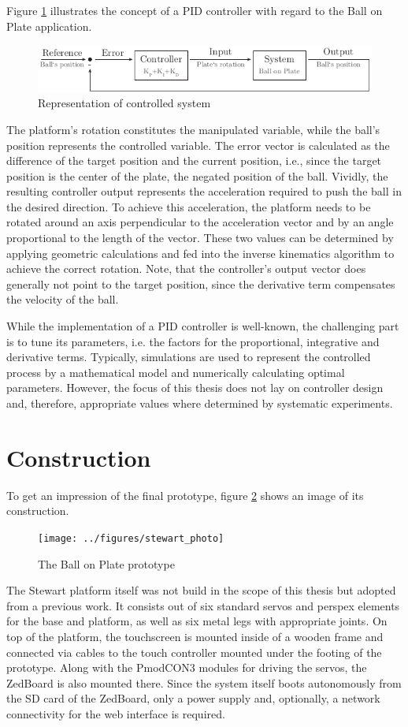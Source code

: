 Figure \ref{fig:pid_rep} illustrates the concept of a \ac{PID} controller with
regard to the Ball on Plate application.
\begin{figure}
	\centering
	\centering
	\includegraphics{../figures/pid_rep}
	\caption{Representation of controlled system}
	\label{fig:pid_rep}
\end{figure}
The platform's rotation constitutes the manipulated variable, while the ball's
position represents the controlled variable. The error vector is calculated as
the difference of the target position and the current position, i.e., since
the target position is the center of the plate, the negated position of the
ball. Vividly, the resulting controller output represents the acceleration
required to push the ball in the desired direction. To achieve this
acceleration, the platform needs to be rotated around an axis perpendicular to
the acceleration vector and by an angle proportional to the length of the
vector. These two values can be determined by applying geometric calculations
and fed into the inverse kinematics algorithm to achieve the correct rotation.
Note, that the controller's output vector does generally not point to the
target position, since the derivative term compensates the velocity of the
ball.

While the implementation of a \ac{PID} controller is well-known, the
challenging part is to tune its parameters, i.e. the factors for the
proportional, integrative and derivative terms. Typically, simulations are
used to represent the controlled process by a mathematical model and
numerically calculating optimal parameters. However, the focus of this thesis
does not lay on controller design and, therefore, appropriate values where
determined by systematic experiments.

\section{Construction}
To get an impression of the final prototype, figure \ref{fig:stewart_photo}
shows an image of its construction.
\begin{figure}
	\centering
	\texttt{[image: ../figures/stewart\_photo]}
	\caption{The Ball on Plate prototype}
	\label{fig:stewart_photo}
\end{figure}
The Stewart platform itself was not build in the scope of this thesis but
adopted from a previous work. It consists out of six standard servos and
perspex elements for the base and platform, as well as six metal legs with
appropriate joints. On top of the platform, the touchscreen is mounted inside
of a wooden frame and connected via cables to the touch controller mounted
under the footing of the prototype. Along with the PmodCON3 modules for
driving the servos, the ZedBoard is also mounted there. Since the system
itself boots autonomously from the SD card of the ZedBoard, only a power
supply and, optionally, a network connectivity for the web interface is required.

